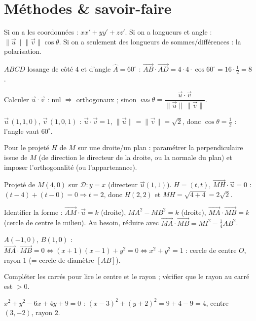 \section{Méthodes \& savoir-faire}

Si on a les coordonnées : $xx'+yy'+zz'$. Si on a longueurs et angle :
$\|\vec u\|\|\vec v\|\cos\theta$. Si on a seulement des longueurs de sommes/différences :
la polarisation.
\begin{exemple}
$ABCD$ losange de côté $4$ et d'angle $\widehat A=60^\circ$ :
$\overrightarrow{AB}\cdot\overrightarrow{AD}=4\cdot4\cdot\cos60^\circ=16\cdot\tfrac12=8$.
\end{exemple}

Calculer $\vec u\cdot\vec v$ : nul $\Rightarrow$ orthogonaux ; sinon
$\cos\theta=\dfrac{\vec u\cdot\vec v}{\|\vec u\|\,\|\vec v\|}$.
\begin{exemple}
$\vec u\,(1,1,0)$, $\vec v\,(1,0,1)$ : $\vec u\cdot\vec v=1$, $\|\vec u\|=\|\vec v\|=\sqrt2$,
donc $\cos\theta=\tfrac12$ : l'angle vaut $60^\circ$.
\end{exemple}

Pour le projeté $H$ de $M$ sur une droite/un plan : paramétrer la perpendiculaire
issue de $M$ (de direction le directeur de la droite, ou la normale du plan) et imposer
l'orthogonalité (ou l'appartenance).
\begin{exemple}
Projeté de $M(4,0)$ sur $\mathcal D:y=x$ (directeur $\vec u(1,1)$). $H=(t,t)$,
$\overrightarrow{MH}\cdot\vec u=0$ : $(t-4)+(t-0)=0\Rightarrow t=2$, donc $H(2,2)$ et
$MH=\sqrt{4+4}=2\sqrt2$.
\end{exemple}

Identifier la forme : $\overrightarrow{AM}\cdot\vec u=k$ (droite),
$MA^{2}-MB^{2}=k$ (droite), $\overrightarrow{MA}\cdot\overrightarrow{MB}=k$ (cercle de
centre le milieu). Au besoin, réduire avec $\overrightarrow{MA}\cdot\overrightarrow{MB}=MI^{2}-\tfrac14 AB^{2}$.
\begin{exemple}
$A(-1,0)$, $B(1,0)$ : $\overrightarrow{MA}\cdot\overrightarrow{MB}=0\iff(x+1)(x-1)+y^{2}=0\iff x^{2}+y^{2}=1$ :
cercle de centre $O$, rayon $1$ (= cercle de diamètre $[AB]$).
\end{exemple}

Compléter les carrés pour lire le centre et le rayon ; vérifier que le rayon au carré est
$>0$.
\begin{exemple}
$x^{2}+y^{2}-6x+4y+9=0$ : $(x-3)^{2}+(y+2)^{2}=9+4-9=4$, centre $(3,-2)$, rayon $2$.
\end{exemple}

